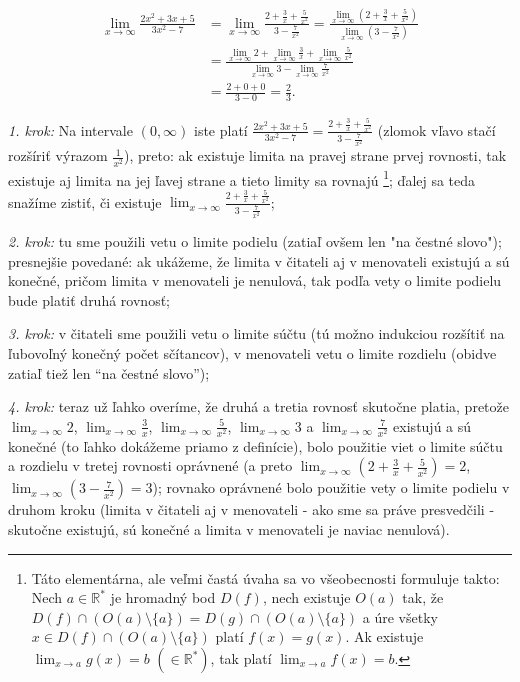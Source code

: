 \[
  \begin{split}
    \lim_{x \rightarrow \infty} \frac{2x^2 + 3x + 5}{3x^2 - 7}
      &= \lim_{x \rightarrow \infty}
          \frac{
            2
            + \frac{3}{x}
            + \frac{5}{x^2}}{3 - \frac{7}{x^2}}
      = \frac{\lim_{x \rightarrow \infty}
        (
          2
          + \frac{3}{x}
          + \frac{5}{x^2}
        )}{
          \lim_{x \rightarrow \infty} (3 - \frac{7}{x^2})
        } \\
      &= \frac{
          \lim_{x \rightarrow \infty}
          2
          + \lim_{x \rightarrow \infty} \frac{3}{x}
          + \lim_{x \rightarrow \infty} \frac{5}{x^2}
        }{
          \lim_{x \rightarrow \infty} 3
          -
          \lim_{x \rightarrow \infty}
            \frac{7}{x^2}
        } \\
      &= \frac{2+0+0}{3-0}
      = \frac{2}{3}.
  \end{split}
\]

\textit{1. krok:}
Na intervale $(0,\infty)$ iste platí
$\frac{2x^2+3x+5}{3x^2-7}=\frac{2+\frac{3}{x}+\frac{5}{x^2}}{3-\frac{7}{x^2}}$
(zlomok vľavo stačí rozšíriť výrazom $\frac{1}{x^2}$), preto: ak existuje limita
na pravej strane prvej rovnosti, tak existuje aj limita na jej ľavej strane a
tieto limity sa rovnajú \footnote{Táto elementárna, ale veľmi častá úvaha sa vo
všeobecnosti formuluje takto: Nech $a \in \mathbb{R^*}$ je hromadný bod $D(f)$,
nech existuje $O(a)$ tak, že $D(f) \cap (O(a) \setminus \{ a\})=D(g) \cap (O(a)
\setminus \{ a\})$ a úre všetky $x \in D(f) \cap (O(a) \setminus \{ a\})$ platí
$f(x)=g(x)$. Ak existuje $\lim_{x \rightarrow a} g(x)=b$ $(\in \mathbb{R^*})$,
tak platí $\lim_{x \rightarrow a} f(x)=b$.}; ďalej sa teda snažíme zistiť, či
existuje $\lim_{x \rightarrow
\infty}\frac{2+\frac{3}{x}+\frac{5}{x^2}}{3-\frac{7}{x^2}}$;

\textit{2. krok:}
tu sme použili vetu o limite podielu (zatiaľ ovšem len "na čestné slovo");
presnejšie povedané: ak ukážeme, že limita v čitateli aj v menovateli existujú a
sú konečné, pričom limita v menovateli je nenulová, tak podľa vety o limite
podielu bude platiť druhá rovnosť;

\textit{3. krok:}
v čitateli sme použili vetu o limite súčtu (tú možno indukciou rozšítiť na
ľubovoľný konečný počet sčítancov), v menovateli vetu o limite rozdielu (obidve
zatiaľ tiež len ``na čestné slovo'');

\textit{4. krok:}
teraz už ľahko overíme, že druhá a tretia rovnosť skutočne platia, pretože
$\lim_{x \rightarrow \infty} 2$, $\lim_{x \rightarrow \infty} \frac{3}{x}$,
$\lim_{x \rightarrow \infty} \frac{5}{x^2}$, $\lim_{x \rightarrow \infty} 3$ a
$\lim_{x \rightarrow \infty} \frac{7}{x^2}$ existujú a sú konečné (to ľahko
dokážeme priamo z definície), bolo použitie viet o limite súčtu a rozdielu v
tretej rovnosti oprávnené (a preto $\lim_{x \rightarrow \infty}
(2 + \frac{3}{x} + \frac{5}{x^2}) = 2$, $\lim_{x \rightarrow \infty}
(3 - \frac{7}{x^2}) = 3$); rovnako oprávnené bolo použitie vety o limite podielu v
druhom kroku (limita v čitateli aj v menovateli - ako sme sa práve presvedčili -
skutočne existujú, sú konečné a limita v menovateli je naviac nenulová).

